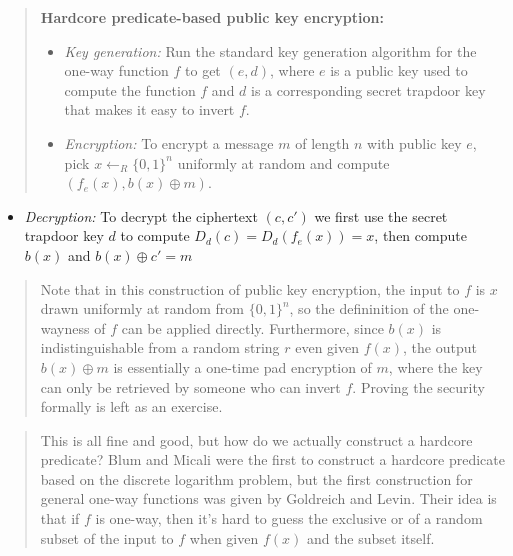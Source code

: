 \begin{quote}
\textbf{Hardcore predicate-based public key encryption:}

\begin{itemize}
\item
  \emph{Key generation:} Run the standard key generation algorithm for
  the one-way function \(f\) to get \((e, d)\), where \(e\) is a public
  key used to compute the function \(f\) and \(d\) is a corresponding
  secret trapdoor key that makes it easy to invert \(f\).
\item
  \emph{Encryption:} To encrypt a message \(m\) of length \(n\) with
  public key \(e\), pick \(x \leftarrow_R \{0, 1\}^n\) uniformly at
  random and compute \((f_e(x), b(x) \oplus m)\).
\end{itemize}
\end{quote}

\begin{itemize}
\tightlist
\item
  \emph{Decryption:} To decrypt the ciphertext \((c, c')\) we first use
  the secret trapdoor key \(d\) to compute \(D_d(c) = D_d(f_e(x)) = x\),
  then compute \(b(x)\) and \(b(x) \oplus c' = m\)
\end{itemize}


\begin{quote}
Note that in this construction of public key encryption, the input to
\(f\) is \(x\) drawn uniformly at random from \(\{0, 1\}^n\), so the
defininition of the one-wayness of \(f\) can be applied directly.
Furthermore, since \(b(x)\) is indistinguishable from a random string
\(r\) even given \(f(x)\), the output \(b(x) \oplus m\) is essentially a
one-time pad encryption of \(m\), where the key can only be retrieved by
someone who can invert \(f\). Proving the security formally is left as
an exercise.
\end{quote}

\begin{quote}
This is all fine and good, but how do we actually construct a hardcore
predicate? Blum and Micali were the first to construct a hardcore
predicate based on the discrete logarithm problem, but the first
construction for general one-way functions was given by Goldreich and
Levin. Their idea is that if \(f\) is one-way, then it's hard to guess
the exclusive or of a random subset of the input to \(f\) when given
\(f(x)\) and the subset itself.
\end{quote}

